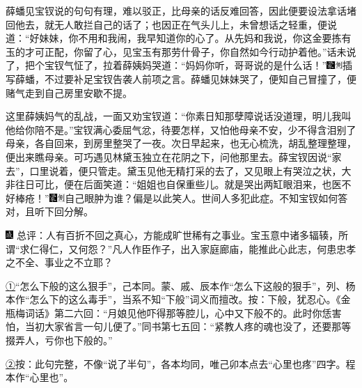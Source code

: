 薛蟠见宝钗说的句句有理，难以驳正，比母亲的话反难回答，因此便要设法拿话堵回他去，就无人敢拦自己的话了；也因正在气头儿上，未曾想话之轻重，便说道：``好妹妹，你不用和我闹，我早知道你的心了。从先妈和我说，你这金要拣有玉的才可正配，你留了心，见宝玉有那劳什骨子，你自然如今行动护着他。''话未说了，把个宝钗气怔了，拉着薛姨妈哭道：``妈妈你听，哥哥说的是什么话！''{\includegraphics[width=3mm]{../Images/00006}\includegraphics[width=3mm]{../Images/00011}\footnotesize \kaishu 插写薛蟠，不过要补足宝钗告袭人前项之言。}薛蟠见妹妹哭了，便知自己冒撞了，便赌气走到自己房里安歇不提。

这里薛姨妈气的乱战，一面又劝宝钗道：``你素日知那孽障说话没道理，明儿我叫他给你陪不是。''宝钗满心委屈气忿，待要怎样，又怕他母亲不安，少不得含泪别了母亲，各自回来，到房里整哭了一夜。次日早起来，也无心梳洗，胡乱整理整理，便出来瞧母亲。可巧遇见林黛玉独立在花阴之下，问他那里去。薛宝钗因说``家去''，口里说着，便只管走。黛玉见他无精打采的去了，又见眼上有哭泣之状，大非往日可比，便在后面笑道：``姐姐也自保重些儿。就是哭出两缸眼泪来，也医不好棒疮！''{\includegraphics[width=3mm]{../Images/00006}\includegraphics[width=3mm]{../Images/00011}\footnotesize \kaishu 自己眼肿为谁？偏是以此笑人。世间人多犯此症。}不知宝钗如何答对，且听下回分解。

{\includegraphics[width=3mm]{../Images/00005}  \kaishu 总评：人有百折不回之真心，方能成旷世稀有之事业。宝玉意中诸多辐辏，所谓``求仁得仁，又何怨？''凡人作臣作子，出入家庭廊庙，能推此心此志，何患忠孝之不全、事业之不立耶？}

{\href{../Text/part0038_split_000.html\#navto_1_a}{①}``怎么下般的这么狠手''，己本同。蒙、戚、辰本作``怎么下这般的狠手''，列、杨本作``怎么下的这么毒手''，当系不知``下般''词义而擅改。按：下般，犹忍心。《金瓶梅词话》第二六回：``月娘见他吓得那等腔儿，心中又下般不的。此时你恁害怕，当初大家省言一句儿便了。''同书第七五回：``紧教人疼的魂也没了，还要那等掇弄人，亏你也下般的。''}

{\href{../Text/part0038_split_000.html\#navto_2_a}{②}按：此句完整，不像``说了半句''，各本均同，唯己卯本点去``心里也疼''四字。程本作``心里也''。}
